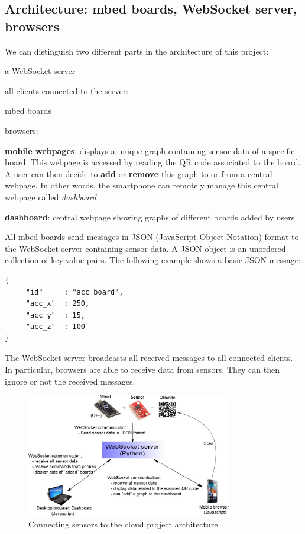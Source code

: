 \documentclass[pdftex,10pt,a4paper]{report}
\newenvironment{packed_item}{
\begin{itemize}
  \setlength{\itemsep}{1pt}
  \setlength{\parskip}{0pt}
  \setlength{\parsep}{0pt}
}{\end{itemize}}
\begin{document}
\newpage

\subsection{Architecture: mbed boards, WebSocket server, browsers}
We can distinguish two different parts in the architecture of this project:
\begin{packed_item}
	\item a WebSocket server
	\item all clients connected to the server:
	\begin{packed_item}
		\item mbed boards
		\item browsers:
		\begin{packed_item}
			\item \textbf{mobile webpages}: displays a unique graph containing sensor data of a specific board. This webpage is accessed by reading the QR code associated to the board. A user can then decide to \textbf{add} or \textbf{remove} this graph to or from a central webpage. In other words, the smartphone can remotely manage this central webpage called \textit{dashboard}
			\item \textbf{dashboard}: central webpage showing graphs of different boards added by users
		\end{packed_item}
	\end{packed_item}
\end{packed_item}

All mbed boards send messages in JSON (JavaScript Object Notation) format to the WebSocket server containing sensor data. A JSON object is an unordered collection of key:value pairs. The following example shows a basic JSON message:
\begin{lstlisting}[label=JSON message example,caption=JSON message example]
{
     "id"     : "acc_board",
     "acc_x"  : 250,
     "acc_y"  : 15,
     "acc_z"  : 100
}
\end{lstlisting}

The WebSocket server broadcasts all received messages to all connected clients. In particular, browsers are able to receive data from sensors. They can then ignore or not the received messages.

\begin{figure}[h!]
		\centering
		\includegraphics[width=0.8\textwidth]{./ws_arch.jpg}
		\caption{Connecting sensors to the cloud project architecture}
		\label{Connecting sensors to the cloud project architecture}
\end{figure}
\end{document}
